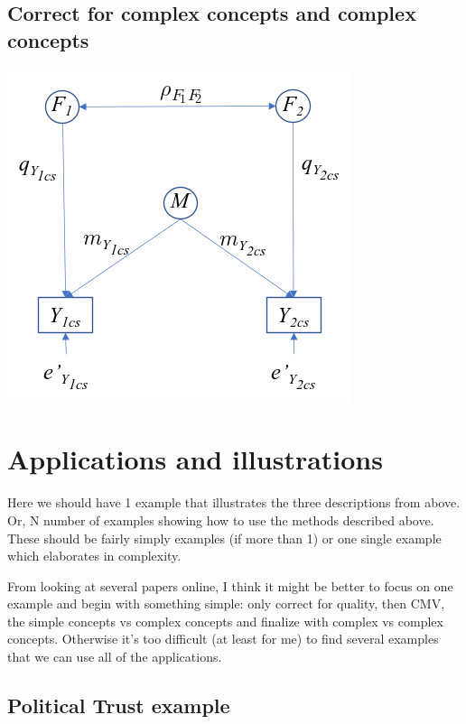 \documentclass[
]{jss}
\begin{document}
\hypertarget{correct-for-complex-concepts-and-complex-concepts}{%
\subsection{Correct for complex concepts and complex
concepts}\label{correct-for-complex-concepts-and-complex-concepts}}

\begin{CodeChunk}


\begin{center}\includegraphics[width=0.5\linewidth]{figs/complexcomplex} \end{center}

\end{CodeChunk}

\hypertarget{applications-and-illustrations}{%
\section{Applications and
illustrations}\label{applications-and-illustrations}}

Here we should have 1 example that illustrates the three descriptions
from above. Or, N number of examples showing how to use the methods
described above. These should be fairly simply examples (if more than 1)
or one single example which elaborates in complexity.

From looking at several papers online, I think it might be better to
focus on one example and begin with something simple: only correct for
quality, then CMV, the simple concepts vs complex concepts and finalize
with complex vs complex concepts. Otherwise it's too difficult (at least
for me) to find several examples that we can use all of the
applications.

\hypertarget{political-trust-example}{%
\subsection{Political Trust example}\label{political-trust-example}}
\end{document}
